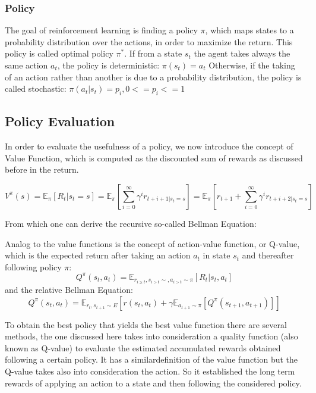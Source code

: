 \subsubsection{Policy}
The goal of reinforcement learning is finding a policy \(\pi\), which maps states to a probability distribution over the actions, in order to maximize the return. This policy is called optimal policy \(\pi^*\).
If from a state \(s_t\) the agent takes always the same action \(a_t\), the policy is deterministic:
\(\pi(s_t) = a_t\)
Otherwise, if the taking of an action rather than another is due to a probability distribution, the policy is called stochastic:
\(\pi(a_t|s_t) = p_i, 0<=p_i<=1\)

\subsection{Policy Evaluation}
In order to evaluate the usefulness of a policy, we now introduce the concept of Value Function, which is computed as the discounted sum of rewards as discussed before in the return.


\[V^\pi(s) = \mathbb{E}_\pi{\left[R_t|s_t=s\right]}= \mathbb{E}_\pi\left[\sum^{\infty}_{i=0}\gamma^ir_{t+i+1|s_t=s}\right] = \mathbb{E}_\pi\left[r_{t+1} + \sum^{\infty}_{i=0}\gamma^ir_{t+i+2|s_t=s}\right]\]

From which one can derive the recursive so-called Bellman Equation:

Analog to the value functions is the concept of action-value function, or Q-value, which is the expected return after taking an action \(a_t\) in state \(s_t\) and thereafter following policy \(\pi\):
\[Q^\pi(s_t,a_t)=\mathbb{E}_{r_{i \geq t},s_{i>t} \sim ,a_{i>t} \sim \pi}[R_t|s_t,a_t]\]
and the relative Bellman Equation:
\[Q^\pi(s_t,a_t)=\mathbb{E}_{r_t,s_{t+1} \sim E }\left[ r(s_t,a_t) + \gamma \mathbb{E}_{a_{t+1} \sim \pi}\left[Q^\pi (s_{t+1},a_{t+1})\right]\right]\]

To obtain the best policy that yields the best value function there are several methods, the one discussed here takes into consideration a quality function (also known as Q-value) to evaluate the estimated accumulated rewards obtained following a certain policy. It has a similardefinition of the value function but the Q-value takes also into consideration the action. So it established the long term rewards of applying an action to a state and then following the considered policy. 

